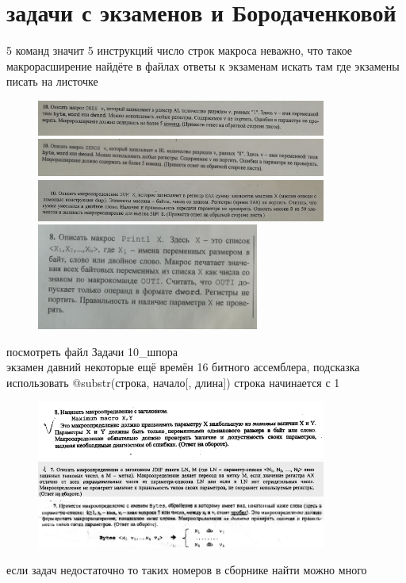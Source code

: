 \documentclass[a4paper,10pt]{article}
\begin{document}
\section*{задачи с экзаменов и Бородаченковой}
    5 команд значит 5 инструкций число строк макроса неважно, что такое макрорасширение найдёте в файлах ответы к экзаменам искать там где экзамены писать на листочке\\
    \begin{figure}[htbp]
        \includegraphics[width=0.85\textwidth]{Ones.png}
        \includegraphics[width=0.85\textwidth]{Zeros.png}
        \includegraphics[width=0.85\textwidth]{SUM.png}
        \includegraphics[width=0.65\textwidth]{Print1.png}
    \end{figure}
    посмотреть файл Задачи 10\_шпора \\
    экзамен давний некоторые ещё времён 16 битного ассемблера, подсказка использовать @substr(строка, начало[, длина]) строка начинается с 1
    \begin{figure}[htbp]
        \includegraphics[width=0.85\textwidth]{Maximum.png}
        \includegraphics[width=0.85\textwidth]{JDIF.png}
        \includegraphics[width=0.85\textwidth]{Bytes.png}
    \end{figure}
    если задач недостаточно то таких номеров в сборнике найти можно много \\
\end{document}
